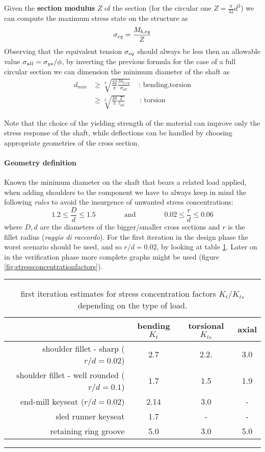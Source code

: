 	Given the \textbf{section modulus} $Z$ of the section (for the circular one $Z = \frac \pi {32} d^3$) we can compute the maximum stress state on the structure as
	\begin{equation}
		\sigma_{eq} = \frac{M_{b,eq}}{Z}
	\end{equation}
	Observing that the equivalent tension $\sigma_{eq}$ should always be less then an allowable value $\sigma_{all} = \sigma_{ys}/\phi$, by inverting the previous formula for the case of a full circular section we can dimension the minimum diameter of the shaft as
	\begin{equation} \label{eq:shaft:dmin}
		\begin{split}
			d_{min} & \geq \sqrt[3]{\frac{32}{\pi} \frac{M_{b,eq}}{\sigma_{all}} } \quad \,\textrm{: bending,torsion} \\
			& \geq \sqrt[3]{\frac{16}{\pi} \frac{T}{\tau_{all}} } \qquad \textrm{: torsion} 
		\end{split}
	\end{equation}
	
	Note that the choice of the yielding strength of the material can improve only the stress response of the shaft, while deflections can be handled by choosing appropriate geometries of the cross section.
	
	\paragraph{Geometry definition} Known the minimum diameter on the shaft that bears a related load applied, when adding shoulders to the component we have to always keep in mind the following \textit{rules} to avoid the insurgence of unwanted stress concentrations:
	\[ 1.2 \leq \frac D d \leq 1.5 \qquad \qquad \textrm{and} \qquad \qquad 0.02 \leq \frac r d\leq 0.06 \]
	where $D,d$ are the diameters of the bigger/smaller cross sections and $r$ is the fillet radius (\textit{raggio di raccordo}). For the first iteration in the design phase the worst scenario should be used, and so $r/d = 0.02$, by looking at table \ref{tab:scf-firstiter}. Later on in the verification phase more complete graphs might be used (figure \ref{fig:stressconcentrationfactors}).
	
	
	\begin{table}[bt]
		\centering
		\rule{0.8\linewidth}{1pt}
		\caption{first iteration estimates for stress concentration factors $K_t$/$K_{ts}$ depending on the type of load.}
		\label{tab:scf-firstiter}
		\begin{tabular}{ r | c c c }
			& bending $K_t$ & torsional $K_{ts}$ & axial \\ \hline
			shoulder fillet - sharp ($r/d=0.02$) & 2.7 & 2.2. & 3.0 \\
			shoulder fillet - well rounded ($r/d=0.1$) & 1.7 & 1.5 & 1.9 \\
			end-mill keyseat ($r/d=0.02$) & 2.14  & 3.0 & - \\
			sled runner keyseat & 1.7 & - & - \\
			retaining ring groove & 5.0 & 3.0 & 5.0
		\end{tabular}
		\rule{0.8\linewidth}{1pt}
	\end{table}
	
